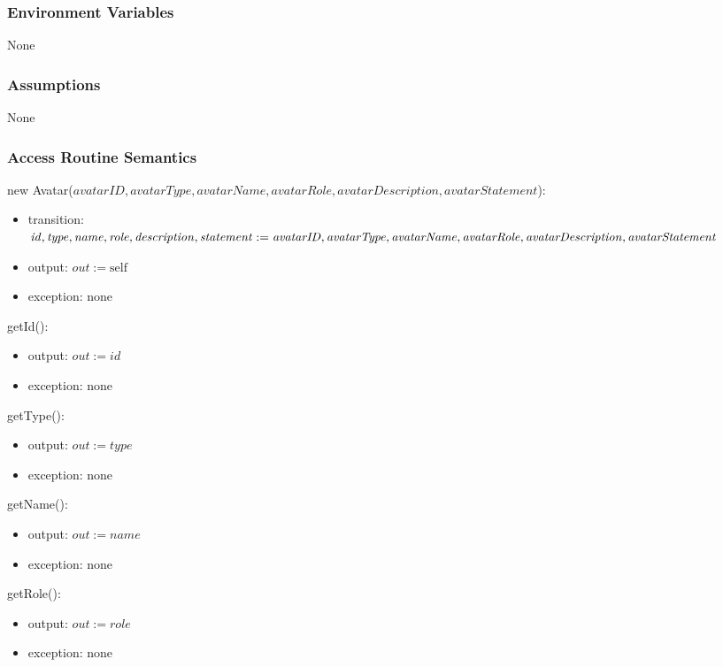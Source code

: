 \documentclass[12pt, titlepage]{article}
\begin{document}
\subsubsection{Environment Variables}
None

\subsubsection{Assumptions}
None

\subsubsection{Access Routine Semantics}

\noindent new Avatar($\mathit{avatarID}, \mathit{avatarType}, \mathit{avatarName}, \mathit{avatarRole}, \mathit{avatarDescription}, \mathit{avatarStatement}$):
\begin{itemize}
\item transition: $\mathit{id}, \mathit{type}, \mathit{name}, \mathit{role}, \mathit{description}, \mathit{statement}:= \mathit{avatarID}, \mathit{avatarType}, \newline \mathit{avatarName}, \mathit{avatarRole},\mathit{avatarDescription}, \mathit{avatarStatement}$
\item output: $out := \mbox{self}$
\item exception: none
\end{itemize}


\noindent getId():
\begin{itemize}
\item output: $out := \mathit{id}$
\item exception: none
\end{itemize}


\noindent getType():
\begin{itemize}
\item output: $out := \mathit{type}$
\item exception: none
\end{itemize}


\noindent getName():
\begin{itemize}
\item output: $out := \mathit{name}$
\item exception: none
\end{itemize}


\noindent getRole():
\begin{itemize}
\item output: $out := \mathit{role}$
\item exception: none
\end{itemize}
\end{document}
